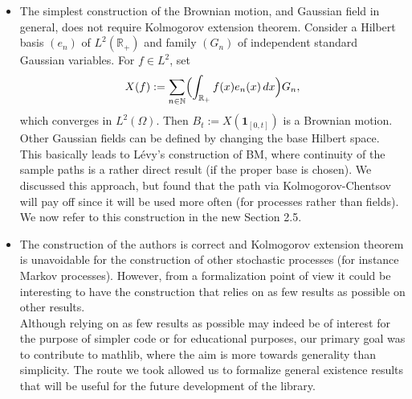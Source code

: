 \documentclass[11pt]{article}
\begin{document}
\begin{itemize}
  \\{\color{blue}Thanks for pointing this out! Since the Bochner-Minlos theorem is not yet part of mathlib, this is not an option at the moment. We have added two sentences on the construction of Gaussian distributions on more general spaces at the beginning of 4.3.}
  \item The simplest construction of the Brownian motion, and Gaussian field in general, does not require Kolmogorov extension theorem. Consider a Hilbert basis $(e_n)$ of $L^2(\mathbb{R}_+)$ and family $(G_n)$ of independent standard Gaussian variables. For $f \in L^2$, set
  \[
    X(f) := \sum_{n \in \mathbb{N}} \Bigl( \int_{\mathbb{R}_+} f(x) e_n(x)\,dx \Bigr) G_n,
  \]
  which converges in $L^2(\Omega)$. Then $B_t := X(\mathbf{1}_{[0,t]})$ is a Brownian motion. Other Gaussian fields can be defined by changing the base Hilbert space.
  \\{\color{blue}This basically leads to Lévy's construction of BM, where continuity of the sample paths is a rather direct result (if the proper base is chosen). We discussed this approach, but found that the path via Kolmogorov-Chentsov will pay off since it will be used more often (for processes rather than fields). We now refer to this construction in the new Section 2.5.}
  \item The construction of the authors is correct and Kolmogorov extension
  theorem is unavoidable for the construction of other stochastic processes
  (for instance Markov processes). However, from a formalization point of
  view it could be interesting to have the construction that relies on as few results as possible on other results.
  \\{\color{blue} Although relying on as few results as possible may indeed be of interest for the purpose of simpler code or for educational purposes, our primary goal was to contribute to mathlib, where the aim is more towards generality than simplicity. The route we took allowed us to formalize general existence results that will be useful for the future development of the library.}
\end{itemize}
\end{document}

